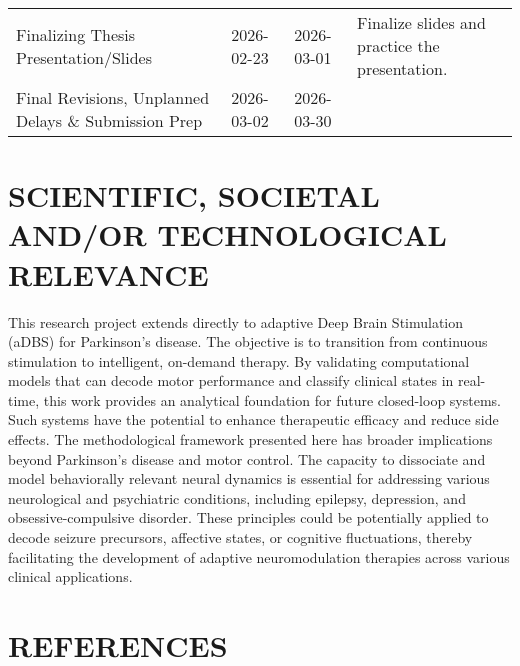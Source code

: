 \documentclass[12pt, letterpaper]{article}
\begin{document}
\begin{table}[h!]
{\begin{tabularx}{\textwidth}{>{\RaggedRight}X l l >{\RaggedRight}X}
            Finalizing Thesis Presentation/Slides                & 2026-02-23          & 2026-03-01        & Finalize slides and practice the presentation.                                                                              \\

            Final Revisions, Unplanned Delays \& Submission Prep & 2026-03-02          & 2026-03-30        &                                                                                                                             \\
        \end{tabularx}
    }
\end{table}

\newpage

\section{SCIENTIFIC, SOCIETAL AND/OR TECHNOLOGICAL RELEVANCE}

This research project extends directly to adaptive Deep Brain Stimulation (aDBS) for Parkinson's disease. The objective is to transition from continuous stimulation to intelligent, on-demand therapy. By validating computational models that can decode motor performance and classify clinical states in real-time, this work provides an analytical foundation for future closed-loop systems. Such systems have the potential to enhance therapeutic efficacy and reduce side effects. The methodological framework presented here has broader implications beyond Parkinson's disease and motor control. The capacity to dissociate and model behaviorally relevant neural dynamics is essential for addressing various neurological and psychiatric conditions, including epilepsy, depression, and obsessive-compulsive disorder. These principles could be potentially applied to decode seizure precursors, affective states, or cognitive fluctuations, thereby facilitating the development of adaptive neuromodulation therapies across various clinical applications.
\section{REFERENCES}
\printbibliography[heading=none]
\end{document}
